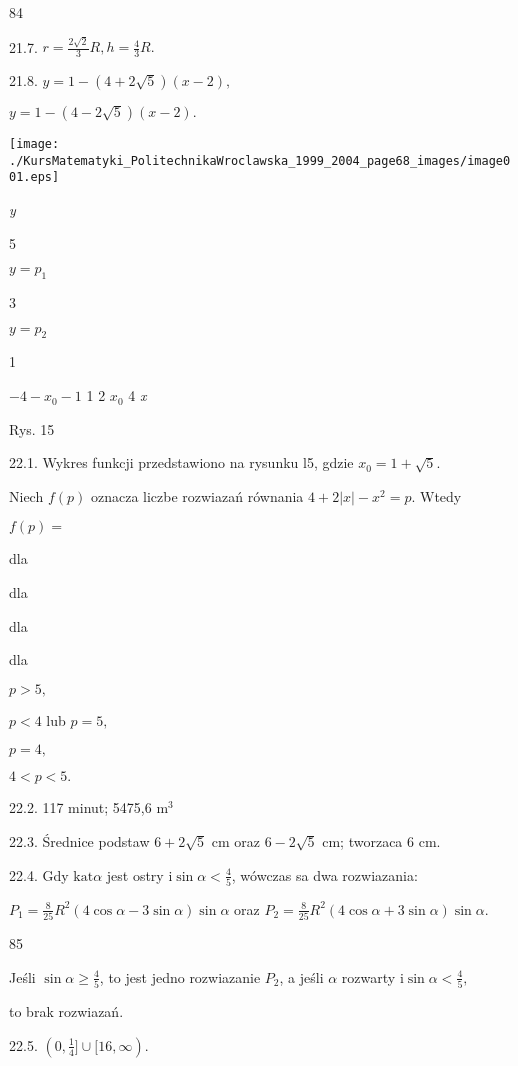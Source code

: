 \documentclass[a4paper,12pt]{article}
\begin{document}
84

21.7. $r=\displaystyle \frac{2\sqrt{2}}{3}R, h=\displaystyle \frac{4}{3}R.$

21.8. $y=1-(4+2\sqrt{5})(x-2),$

$y=1-(4-2\sqrt{5})(x-2).$
\begin{center}
\texttt{[image: ./KursMatematyki\_PolitechnikaWroclawska\_1999\_2004\_page68\_images/image001.eps]}
\end{center}
{\it y}

5

$y=p_{1}$

3

$y=p_{2}$

1

$-4  -x_{0}  -1$  1 2  $x_{0}$  4 {\it x}

Rys. 15

22.1. Wykres funkcji przedstawiono na rysunku l5, gdzie $x_{0}=1+\sqrt{5}.$

Niech $f(p)$ oznacza liczbe rozwiazań równania $4+2|x|-x^{2}=p$. Wtedy

$f(p)=$

dla

dla

dla

dla

$p>5,$

$p<4$ lub $p=5,$

$p=4,$

$4<p<5.$

22.2. 117 minut; 5475,6 $\mathrm{m}^{3}$

22.3. Średnice podstaw $6+2\sqrt{5}$ cm oraz $6-2\sqrt{5}$ cm; tworzaca 6 cm.

22.4. Gdy $\mathrm{k}\mathrm{a}\mathrm{t}\alpha$ jest ostry $\mathrm{i}\sin\alpha < \displaystyle \frac{4}{5}$, wówczas sa dwa rozwiazania:

$ P_{1}=\displaystyle \frac{8}{25}R^{2}(4\cos\alpha-3\sin\alpha)\sin\alpha$ oraz $P_{2}=\displaystyle \frac{8}{25}R^{2}(4\cos\alpha+3\sin\alpha)\sin\alpha.$





85

Jeśli $\displaystyle \sin\alpha\geq\frac{4}{5}$, to jest jedno rozwiazanie $P_{2}$, a jeśli $\alpha$ rozwarty $\displaystyle \mathrm{i}\sin\alpha<\frac{4}{5},$

to brak rozwiazań.

22.5. $(0,\displaystyle \frac{1}{4}]\cup[16,\infty).$
\end{document}
